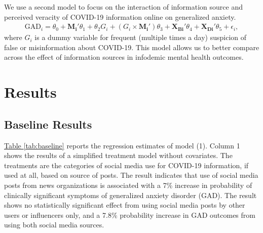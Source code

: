\documentclass{article}[12pt]
\begin{document}
        We use a second model to focus on the interaction of information source and perceived veracity of COVID-19 information online on generalized anxiety.
        \begin{align}
            \text{GAD}_i = \theta_0 + \mathbf{M_i'} \theta_1 + \theta_2 G_i + \left( G_i \times \mathbf{M_i'} \right) \theta_3 + \mathbf{X_{Bi}'} \theta_4 + \mathbf{X_{Di}'} \theta_5 + \epsilon_i,
        \end{align}
         where $G_i$ is a dummy variable for frequent (multiple times a day) suspicion of false or misinformation about COVID-19. This model allows us to better compare across the effect of information sources in infodemic mental health outcomes.
        
    
    \section{Results}    
    
    \subsection{Baseline Results}
    
        \hyperref[tab:baseline]{Table \ref{tab:baseline}} reports the regression estimates of model (1). Column 1 shows the results of a simplified treatment model without covariates. The treatments are the categories of social media use for COVID-19 information, if used at all, based on source of posts. The result indicates that use of social media posts from news organizations is associated with a 7\% increase in probability of clinically significant symptoms of generalized anxiety disorder (GAD). The result shows no statistically significant effect from using social media posts by other users or influencers only, and a 7.8\% probability increase in GAD outcomes from using both social media sources.
        
\end{document}
